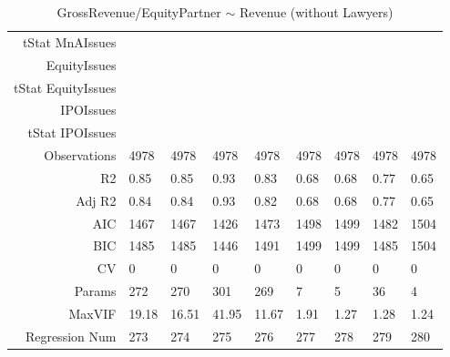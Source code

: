 \begin{table}[ht]
\begin{tabular}{rllllllll}
  tStat MnAIssues &  &  &  &  &  &  &  &  \\ 
  EquityIssues &  &  &  &  &  &  &  &  \\ 
  tStat EquityIssues &  &  &  &  &  &  &  &  \\ 
  IPOIssues &  &  &  &  &  &  &  &  \\ 
  tStat IPOIssues &  &  &  &  &  &  &  &  \\ 
  Observations & 4978 & 4978 & 4978 & 4978 & 4978 & 4978 & 4978 & 4978 \\ 
  R2 & 0.85 & 0.85 & 0.93 & 0.83 & 0.68 & 0.68 & 0.77 & 0.65 \\ 
  Adj R2 & 0.84 & 0.84 & 0.93 & 0.82 & 0.68 & 0.68 & 0.77 & 0.65 \\ 
  AIC & 1467 & 1467 & 1426 & 1473 & 1498 & 1499 & 1482 & 1504 \\ 
  BIC & 1485 & 1485 & 1446 & 1491 & 1499 & 1499 & 1485 & 1504 \\ 
  CV & 0 & 0 & 0 & 0 & 0 & 0 & 0 & 0 \\ 
  Params & 272 & 270 & 301 & 269 & 7 & 5 & 36 & 4 \\ 
  MaxVIF & 19.18 & 16.51 & 41.95 & 11.67 & 1.91 & 1.27 & 1.28 & 1.24 \\ 
  Regression Num & 273 & 274 & 275 & 276 & 277 & 278 & 279 & 280 \\ 
   \hline
\end{tabular}
\caption{GrossRevenue/EquityPartner $\sim$ Revenue (without Lawyers)} 
\end{table}
